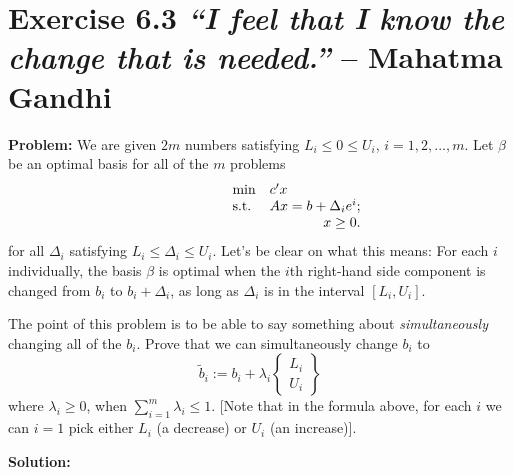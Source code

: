 \section{Exercise 6.3 \emph{``I feel that I know the change that is needed.''} -- Mahatma Gandhi}
\textbf{Problem:} We are given $2m$ numbers satisfying $L_i\leq{}0\leq{}U_i$, $i=1,2,...,m$. Let $\beta$ be an optimal basis for all of the $m$ problems
\begin{equation}
\label{eq: primali}
  \begin{array}{lrcll}
    \min
    & \multicolumn{4}{l}{c'x} \\
    \text{s.t.}
    & Ax=b+\Delta_ie^i;\\
    & x\geq0.
  \end{array}
\end{equation}
for all $\Delta_i$ satisfying $L_i\leq{}\Delta_i\leq{}U_i$. Let’s be clear on what this means: For each $i$ individually, the basis $\beta$ is optimal when the $i$th right-hand side component is changed from $b_i$ to $b_i+\Delta_i$, as long as $\Delta_i$ is in the interval $[L_i,U_i]$. 

The point of this problem is to be able to say something about \textit{simultaneously} changing all of the $b_i$. Prove that we can simultaneously change $b_i$ to
\[
\tilde{b}_i:=b_i+\lambda_i \left\lbrace \begin{array}{c} L_i \\ U_i \end{array}\right\rbrace
\]
where $\lambda_i\geq0$, when $\sum^{m}_{i=1} \lambda_i \leq1$. [Note that in the formula above, for each $i$ we can $i=1$ pick either $L_i$ (a decrease) or $U_i$ (an increase)].

\textbf{Solution:} 